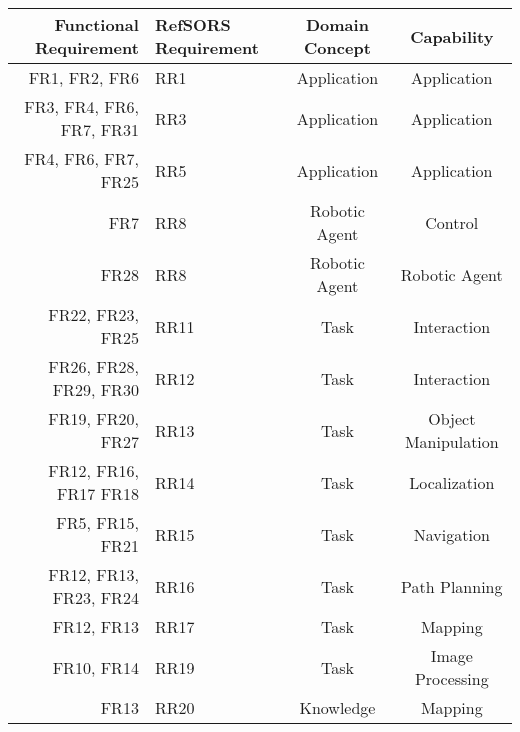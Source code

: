 \begin{table}
	\centering
	\begin{tabular}{| r | p{2cm} | c | c |}
		\hline
		Functional Requirement & RefSORS Requirement & Domain Concept & Capability \\ 
		\hline
		FR1, FR2, FR6 & RR1 & Application & Application \\
		FR3, FR4, FR6, FR7, FR31 & RR3 & Application & Application\\
		FR4, FR6, FR7, FR25 & RR5 & Application & Application\\
		\hline
		FR7 & RR8 & Robotic Agent & Control \\%
		FR28 & RR8 & Robotic Agent & Robotic Agent \\%
		\hline
		FR22, FR23, FR25 & RR11 & Task & Interaction \\
		FR26, FR28, FR29, FR30 & RR12 & Task & Interaction \\
		FR19, FR20, FR27 & RR13 & Task & Object Manipulation\\
		FR12, FR16, FR17 FR18 & RR14 & Task & Localization\\
		FR5, FR15, FR21 & RR15 & Task & Navigation\\
		FR12, FR13, FR23, FR24 & RR16 & Task & Path Planning\\
		FR12, FR13 & RR17 & Task & Mapping \\
		FR10, FR14 & RR19 & Task & Image Processing \\ %
		\hline
		FR13 & RR20 & Knowledge &Mapping \\

\end{tabular}
\end{table}
